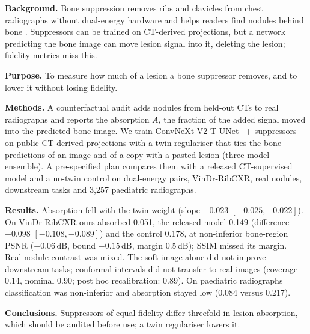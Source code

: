 \textbf{Background.} Bone suppression removes ribs and clavicles from chest radiographs without dual-energy hardware and helps readers find nodules
behind bone \citep{freedman2011lung}. Suppressors can be trained on CT-derived projections, but a network predicting the bone image can move
lesion signal into it, deleting the lesion; fidelity metrics miss this.

\textbf{Purpose.} To measure how much of a lesion a bone suppressor removes, and to lower it without losing fidelity.

\textbf{Methods.} A counterfactual audit adds nodules from held-out CTs to real radiographs and reports the absorption $A$, the fraction of the
added signal moved into the predicted bone image. We train ConvNeXt-V2-T UNet++ suppressors on public CT-derived projections with a twin
regulariser that ties the bone predictions of an image and of a copy with a pasted lesion (three-model ensemble). A pre-specified plan
compares them with a released CT-supervised model and a no-twin control on dual-energy pairs, VinDr-RibCXR, real nodules, downstream tasks
and 3,257 paediatric radiographs.

\textbf{Results.} Absorption fell with the twin weight (slope $-0.023$ $[-0.025,-0.022]$). On VinDr-RibCXR ours absorbed
0.051, the released model 0.149 (difference $-0.098$ $[-0.108,-0.089]$) and the control 0.178, at non-inferior bone-region PSNR ($-0.06$\,dB,
bound $-0.15$\,dB, margin 0.5\,dB); SSIM missed its margin. Real-nodule contrast was mixed. The soft image alone did not improve
downstream tasks; conformal intervals did not transfer to real images (coverage 0.14, nominal 0.90; post hoc recalibration: 0.89). On
paediatric radiographs classification was non-inferior and absorption stayed low (0.084 versus 0.217).

\textbf{Conclusions.} Suppressors of equal fidelity differ threefold in lesion absorption, which should be audited before use; a twin
regulariser lowers it. 
